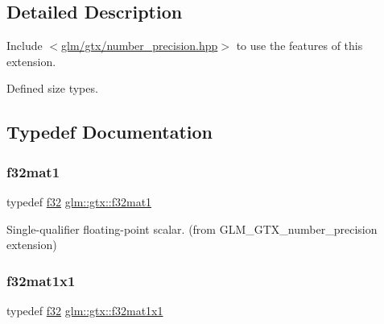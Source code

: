 \subsection{Detailed Description}
Include $<$\mbox{\hyperlink{number__precision_8hpp}{glm/gtx/number\+\_\+precision.\+hpp}}$>$ to use the features of this extension.

Defined size types. 

\subsection{Typedef Documentation}
\mbox{\label{group__gtx__number__precision_gae5ff376ec910c360f06acc0c2b99260c}} 
\subsubsection{\texorpdfstring{f32mat1}{f32mat1}}
{\footnotesize\ttfamily typedef \mbox{\hyperlink{group__gtc__type__precision_ga0ec999b57f5330d9021256e96038df04}{f32}} \mbox{\hyperlink{group__gtx__number__precision_gae5ff376ec910c360f06acc0c2b99260c}{glm\+::gtx\+::f32mat1}}}



Single-\/qualifier floating-\/point scalar. (from G\+L\+M\+\_\+\+G\+T\+X\+\_\+number\+\_\+precision extension) 

\mbox{\label{group__gtx__number__precision_ga01caec78388a82a9a22bd45e5751a38a}} 
\subsubsection{\texorpdfstring{f32mat1x1}{f32mat1x1}}
{\footnotesize\ttfamily typedef \mbox{\hyperlink{group__gtc__type__precision_ga0ec999b57f5330d9021256e96038df04}{f32}} \mbox{\hyperlink{group__gtx__number__precision_ga01caec78388a82a9a22bd45e5751a38a}{glm\+::gtx\+::f32mat1x1}}}



